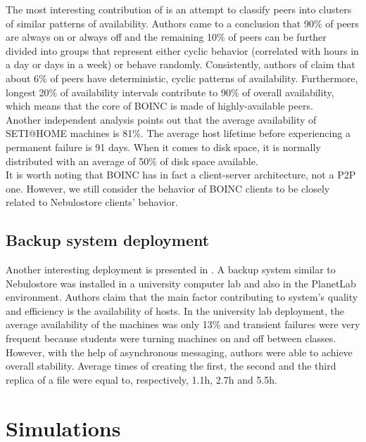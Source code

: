 \documentclass{pracamgren}
\begin{document}
The most interesting contribution of \cite{availability} is an attempt to classify peers into clusters of similar patterns of availability. Authors came to a conclusion that 90\% of peers are always on or always off and the remaining 10\% of peers can be further divided into groups that represent either cyclic behavior (correlated with hours in a day or days in a week) or behave randomly. Consistently, authors of \cite{seti} claim that about 6\% of peers have deterministic, cyclic patterns of availability. Furthermore, longest 20\% of availability intervals contribute to 90\% of overall availability, which means that the core of BOINC is made of highly-available peers.\\

Another independent analysis \cite{storage} points out that the average availability of SETI@HOME machines is 81\%. The average host lifetime before experiencing a permanent failure is 91 days. When it comes to disk space, it is normally distributed with an average of 50\% of disk space available.\\

It is worth noting that BOINC has in fact a client-server architecture, not a P2P one. However, we still consider the behavior of BOINC clients to be closely related to Nebulostore clients' behavior.\\

\subsection{Backup system deployment}

Another interesting deployment is presented in \cite{hetero}. A backup system similar to Nebulostore was installed in a university computer lab and also in the PlanetLab environment. Authors claim that the main factor contributing to system's quality and efficiency is the availability of hosts. In the university lab deployment, the average availability of the machines was only 13\% and transient failures were very frequent because students were turning machines on and off between classes. However, with the help of asynchronous messaging, authors were able to achieve overall stability. Average times of creating the first, the second and the third replica of a file were equal to, respectively, 1.1h, 2.7h and 5.5h.\\

\section{Simulations}
\end{document}
